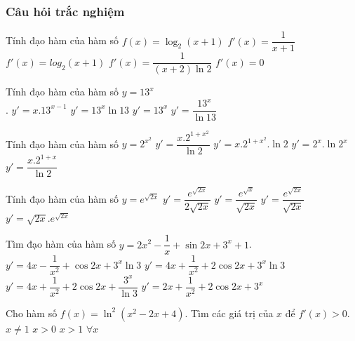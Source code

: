 \subsubsection{Câu hỏi trắc nghiệm}
\begin{ex}%
	Tính đạo hàm của hàm số $f(x)=\log_2(x+1)$ 
	\choice
	{$f'(x)=\dfrac{1}{x+1}$}
	{$f'(x)=log_2(x+1)$}
	{\True $f'(x)=\dfrac{1}{(x+2)\ln 2}$}
	{$f'(x)=0$}
\end{ex}
\begin{ex}%
	Tính đạo hàm của hàm số $y=13^x$\\. 
	\choice
	{$y'=x.13^{x-1}$}
	{\True $y'=13^{x}\ln 13$}
	{$y'=13^x$}
	{$y'=\dfrac{13^x}{\ln 13}$}
\end{ex}
\begin{ex}%
	Tính đạo hàm của hàm số $y=2^{x^2}$
	\choice
	{$y'=\dfrac{x.2^{1+x^2}}{\ln 2}$}
	{\True $y'=x.2^{1+x^2}.\ln 2$}
	{$y'=2^x.\ln 2^x$}
	{$y'=\dfrac{x.2^{1+x}}{\ln 2}$}
\end{ex}
\begin{ex}%
	Tính đạo hàm của hàm số $y=e^{\sqrt{2x}}$
	\choice
	{\True $y'=\dfrac{e^{\sqrt{2x}}}{2\sqrt{2x}}$}
	{$y'=\dfrac{e^{\sqrt{x}}}{\sqrt{2x}}$}
	{$y'=\dfrac{e^{\sqrt{2x}}}{\sqrt{2x}}$}
	{$y'=\sqrt{2x}.e^{\sqrt{2x}}$}
\end{ex}
\begin{ex}%
	Tìm đạo hàm của hàm số $y=2x^2-\dfrac{1}{x}+\sin 2x+3^x+1$. 
	\choice
	{$y'=4x-\dfrac{1}{x^2}+\cos 2x+3^x\ln 3$}
	{\True $y'=4x+\dfrac{1}{x^2}+2\cos 2x+3^x\ln 3$}
	{$y'=4x+\dfrac{1}{x^2}+2\cos 2x+\dfrac{3^x}{\ln 3}$}
	{$y'=2x+\dfrac{1}{x^2}+2\cos 2x+3^x$}
\end{ex}
\begin{ex}%
	Cho hàm số $f(x)=\ln ^2\left(x^2-2x+4\right)$. Tìm các giá trị của $x$ để $f'(x)>0$. 
	\choice
	{$x\neq 1$}
	{$x>0$}
	{\True $x>1$}
	{$\forall x$}
\end{ex}
